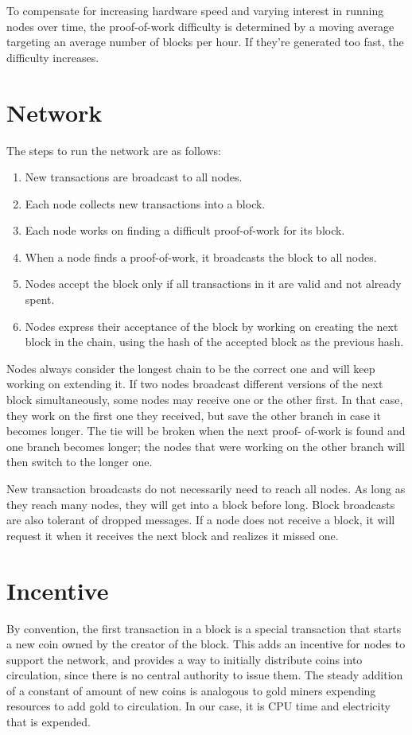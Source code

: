 \documentclass{article}
\begin{document}
To compensate for increasing hardware speed and varying interest in running nodes over time, the proof-of-work difficulty is determined by a moving average targeting an average number of blocks per hour.
If they're generated too fast, the difficulty increases.


\section{Network}\label{sec:network}
The steps to run the network are as follows:
\begin{enumerate}
    \item New transactions are broadcast to all nodes.
    \item Each node collects new transactions into a block.
    \item Each node works on finding a difficult proof-of-work for its block.
    \item When a node finds a proof-of-work, it broadcasts the block to all nodes.
    \item Nodes accept the block only if all transactions in it are valid and not already spent.
    \item Nodes express their acceptance of the block by working on creating the next block in the chain, using the hash of the accepted block as the previous hash.
\end{enumerate}
Nodes always consider the longest chain to be the correct one and will keep working on extending it.  If two nodes broadcast different versions of the next block simultaneously, some nodes may receive one or the other first.
In that case, they work on the first one they received, but save the other branch in case it becomes longer.
The tie will be broken when the next proof- of-work is found and one branch becomes longer; the nodes that were working on the other branch will then switch to the longer one.

New transaction broadcasts do not necessarily need to reach all nodes. As long as they reach many nodes, they will get into a block before long.
Block broadcasts are also tolerant of dropped messages.
If a node does not receive a block, it will request it when it receives the next block and realizes it missed one.


\section{Incentive}\label{sec:incentive}
By convention, the first transaction in a block is a special transaction that starts a new coin owned by the creator of the block.
This adds an incentive for nodes to support the network, and provides a way to initially distribute coins into circulation, since there is no central authority to issue them.
The steady addition of a constant of amount of new coins is analogous to gold miners expending resources to add gold to circulation.
In our case, it is CPU time and electricity that is expended.
\end{document}
